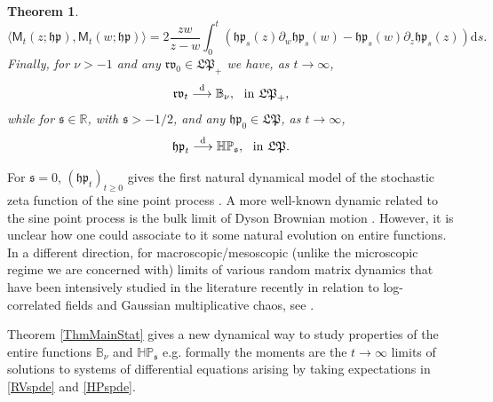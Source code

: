 \documentclass[]{article}
\newtheorem{thm}{Theorem}[section]
\begin{document}
\begin{thm}
\begin{equation}
\langle \mathsf{M}_t(z;\mathfrak{hp}),\mathsf{M}_t(w;\mathfrak{hp})\rangle=2\frac{zw}{z-w}\int_0^t\left(\mathfrak{hp}_s(z)\partial_w\mathfrak{hp}_s(w)-\mathfrak{hp}_s(w)\partial_z\mathfrak{hp}_s(z)\right)\mathrm{d}s.
\end{equation}
Finally, for $\nu>-1$ and any $\mathfrak{rv}_0\in \mathfrak{LP}_+$ we have, as $t \longrightarrow \infty$,
\begin{equation}\label{ConvToEqIB}
\mathfrak{rv}_t \overset{\mathrm{d}}{\longrightarrow} \mathbb{B}_\nu , \ \ \textnormal{in } \mathfrak{LP}_+, 
\end{equation}
while for $\mathfrak{s}\in \mathbb{R}$, with $\mathfrak{s}>-1/2$, and any $\mathfrak{hp}_0\in \mathfrak{LP}$, as $t \to \infty$,
\begin{equation}\label{ConvToEqHP}
\mathfrak{hp}_t \overset{\mathrm{d}}{\longrightarrow} \mathbb{HP}_\mathfrak{s} , \ \ \textnormal{in } \mathfrak{LP}.
\end{equation}
\end{thm}

For $\mathfrak{s}=0$, $(\mathfrak{hp}_t)_{t\ge 0}$ gives the first natural dynamical model of the stochastic zeta function of the sine point process \cite{ChhaibiNajnudelNikeghbali,ValkoVirag2}. A more well-known dynamic related to the sine point process is the bulk limit of Dyson Brownian motion \cite{KatoriTanemura, Tsai,Osada1,Osada2,Osada3,KawamotoOsada, OsadaTanemura, SuzukiErgodicity,SuzukiCurvature}. However, it is unclear how one could associate to it some natural evolution on entire functions. In a different direction, for macroscopic/mesoscopic (unlike the microscopic regime we are concerned with) limits of various random matrix dynamics that have been intensively studied in the literature recently in relation to log-correlated fields and Gaussian multiplicative chaos, see \cite{BourgadeFalconet,BourgadeCipolloniHuang,Keles}.

Theorem \ref{ThmMainStat} gives a new dynamical way to study properties of the entire functions $\mathbb{B}_\nu$ and $\mathbb{HP}_\mathfrak{s}$ e.g. formally the moments are the $t \to \infty $ limits of solutions to systems of differential equations arising by taking expectations in \eqref{RVspde} and \eqref{HPspde}. 
\end{document}
